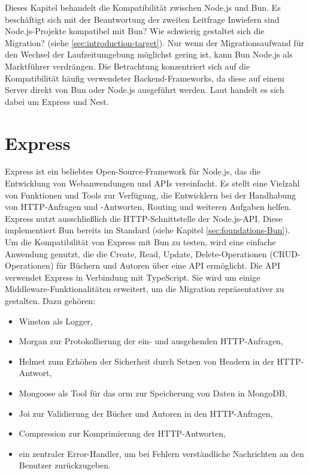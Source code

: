  \label{ch:compabitility}
Dieses Kapitel behandelt die Kompatibilität zwischen Node.js und Bun. Es beschäftigt sich mit der Beantwortung der zweiten Leitfrage \glqq Inwiefern sind Node.js-Projekte kompatibel mit Bun? Wie schwierig gestaltet sich die Migration?\grqq{} (siehe \autoref{sec:introduction-target}). Nur wenn der Migrationsaufwand für den Wechsel der Laufzeitumgebung möglichst gering ist, kann Bun Node.js als Marktführer verdrängen. Die Betrachtung konzentriert sich auf die Kompatibilität häufig verwendeter Backend-Frameworks, da diese auf einem Server direkt von Bun oder Node.js ausgeführt werden. Laut \cite{Greif.2022} handelt es sich dabei um Express und Nest.

\section{Express} \label{sec:compabitility-express}
Express ist ein beliebtes Open-Source-Framework für Node.js, das die Entwicklung von Webanwendungen und APIs vereinfacht. Es stellt eine Vielzahl von Funktionen und Tools zur Verfügung, die Entwicklern bei der Handhabung von HTTP-Anfragen und -Antworten, Routing und weiteren Aufgaben helfen. Express nutzt ausschließlich die HTTP-Schnittstelle der Node.js-API. Diese implementiert Bun bereits im Standard (siehe Kapitel \ref{sec:foundations-Bun}).\cite{Brown.2020}\\

\noindent 
Um die Kompatibilität von Express mit Bun zu testen, wird eine einfache Anwendung genutzt, die die Create, Read, Update, Delete-Operationen (CRUD-Operationen) für Büchern und Autoren über eine API ermöglicht. Die API verwendet Express in Verbindung mit TypeScript. Sie wird um einige Middleware-Funktionalitäten erweitert, um die Migration repräsentativer zu gestalten. Dazu gehören:
\begin{itemize}
	\item Winston als Logger,
	\item Morgan zur Protokollierung der ein- und ausgehenden HTTP-Anfragen,
	\item Helmet zum Erhöhen der Sicherheit durch Setzen von Headern in der HTTP-Antwort,
	\item Mongoose als Tool für das \ac{orm} zur Speicherung von Daten in MongoDB,
	\item Joi zur Validierung der Bücher und Autoren in den HTTP-Anfragen,
	\item Compression zur Komprimierung der HTTP-Antworten,
	\item ein zentraler Error-Handler, um bei Fehlern verständliche Nachrichten an den Benutzer zurückzugeben.
\end{itemize}
	
